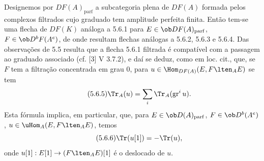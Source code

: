 Designemos por $DF(A)_{\mathrm{parf}}$ a subcategoria plena de $DF(A)$ formada pelos complexos filtrados cujo graduado tem amplitude perfeita finita. Então tem-se uma flecha de $DF(K)$ análoga a 5.6.1 para $E\in\ob DF(A)_{\mathrm{parf}}$, $F\in\ob D^bF(A^e)$, de onde resultam flechas análogas a 5.6.2, 5.6.3 e 5.6.4. Das observações de 5.5 resulta que a flecha 5.6.1 filtrada é compatível com a passagem ao graduado associado (cf. [3] V 3.7.2), e daí se deduz, como em loc. cit., que, se $F$ tem a filtração concentrada em grau $0$, para $u\in\Hom_{DF(A)}(E,F\lten_AE)$ se tem
\begin{equation}\tag{5.6.5}
\Tr_A(u)=\sum_i\Tr_A(\operatorname{gr}^i u).
\end{equation}
Esta fórmula implica, em particular, que, para $E\in\ob D(A)_{\mathrm{parf}}$, $F\in\ob D^b(A^e)$, $u\in\uHom_A(E,F\lten_AE)$, temos
\begin{equation}\tag{5.6.6}
\Tr(u[1])=-\Tr(u),
\end{equation}
onde $u[1]:E[1]\to(F\lten_AE)[1]$ é o deslocado de $u$.
